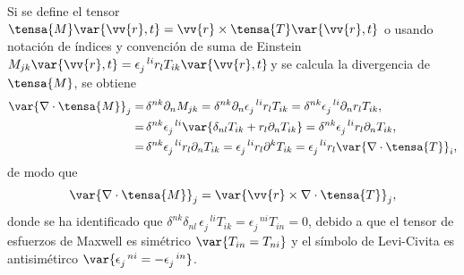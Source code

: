 Si se define el tensor $\tensa{M}\var{\vv{r},t}=\vv{r}\times\tensa{T}\var{\vv{r},t}$ \textemdash o usando notación de índices y convención de suma de Einstein $M_{jk}\var{\vv{r},t}=\epsilon_{j}^{\,\,\,\, li} r_l T_{ik}\var{\vv{r},t}$\textemdash \,y se calcula la divergencia de $\tensa{M}$, se obtiene 
\begin{align}
\var{\nabla\cdot\tensa{M}}_{j} =& \,\delta^{nk} \partial_n M_{jk} = \delta^{nk} \partial_n \epsilon_{j}^{\,\,\,\, li} r_l T_{ik} =\delta^{nk}\epsilon_{j}^{\,\,\,\, li}\partial_n r_l T_{ik}, \nonumber \\
								=& \,\delta^{nk}\epsilon_{j}^{\,\,\,\, li}\var{\delta_{nl} T_{ik} + r_l \partial_n T_{ik}} =\delta^{nk}\epsilon_{j}^{\,\,\,\, li}r_l\partial_n T_{ik}, \nonumber \\
								=& \,\delta^{nk} \epsilon_{j}^{\,\,\,\, li} r_l \partial_n T_{ik} = \epsilon_{j}^{\,\,\,\, li} r_l \partial^k T_{ik} = \epsilon_{j}^{\,\,\,\, li} r_l \var{\nabla\cdot\tensa{T}}_i, 
\end{align}
de modo que
\begin{equation}
\var{\nabla\cdot\tensa{M}}_{j} = \var{\vv{r}\times \nabla\cdot\tensa{T}}_j,
\label{Eq: Div M}
\end{equation}
donde se ha identificado que $\delta^{nk}\delta_{nl}\,\epsilon_{j}^{\,\,\,\, li}T_{ik} = \epsilon_{j}^{\,\,\,\, ni}T_{in} = 0$, debido a que el tensor de esfuerzos de Maxwell es simétrico $\var{T_{in}=T_{ni}}$ y el símbolo de Levi-Civita es antisimétirco $\var{\epsilon_{j}^{\,\,\,\, ni}=-\epsilon_{j}^{\,\,\,\, in}}$.

